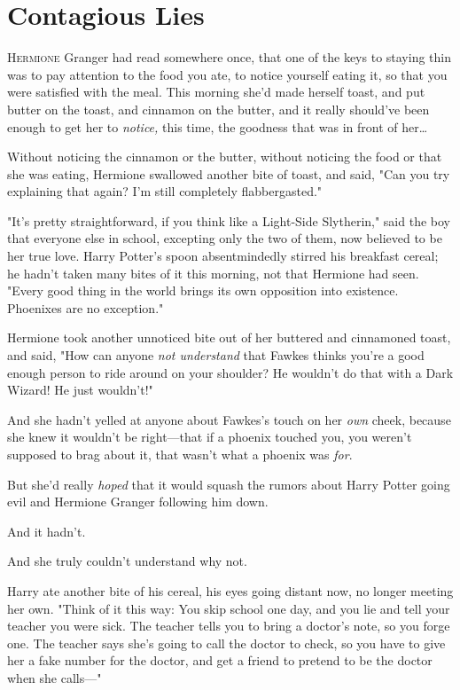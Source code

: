 \chapter{Contagious Lies}

\lettrine{H}{ermione} Granger 
had read somewhere once, that one of the keys to staying thin was to pay 
attention to the food you ate, to notice yourself eating it, so that you were 
satisfied with the meal. This morning she'd made herself toast, and put butter 
on the toast, and cinnamon on the butter, and it really should've been enough 
to get her to \emph{notice,} this time, the goodness that was in front of 
her{\ldots}

Without noticing the cinnamon or the butter, without noticing the food or that 
she was eating, Hermione swallowed another bite of toast, and said, "Can you 
try explaining that again? I'm still completely flabbergasted."

"It's pretty straightforward, if you think like a Light-Side Slytherin," said 
the boy that everyone else in school, excepting only the two of them, now 
believed to be her true love. Harry Potter's spoon absentmindedly stirred his 
breakfast cereal; he hadn't taken many bites of it this morning, not that 
Hermione had seen. "Every good thing in the world brings its own opposition 
into existence. Phoenixes are no exception."

Hermione took another unnoticed bite out of her buttered and cinnamoned toast, 
and said, "How can anyone \emph{not understand} that Fawkes thinks you're a 
good enough person to ride around on your shoulder? He wouldn't do that with a 
Dark Wizard! He just wouldn't!"

And she hadn't yelled at anyone about Fawkes's touch on her \emph{own} cheek, 
because she knew it wouldn't be right---that if a phoenix touched you, you 
weren't supposed to brag about it, that wasn't what a phoenix was \emph{for}.

But she'd really \emph{hoped} that it would squash the rumors about Harry 
Potter going evil and Hermione Granger following him down.

And it hadn't.

And she truly couldn't understand why not.

Harry ate another bite of his cereal, his eyes going distant now, no longer 
meeting her own. "Think of it this way: You skip school one day, and you lie 
and tell your teacher you were sick. The teacher tells you to bring a doctor's 
note, so you forge one. The teacher says she's going to call the doctor to 
check, so you have to give her a fake number for the doctor, and get a friend 
to pretend to be the doctor when she calls---"

